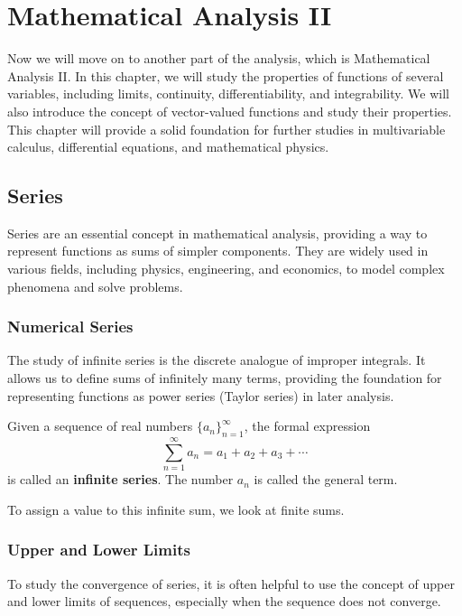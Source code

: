 \chapter{Mathematical Analysis II}

Now we will move on to another part of the analysis, which is Mathematical Analysis II. In this chapter, we will study the properties of functions of several variables, including limits, continuity, differentiability, and integrability. We will also introduce the concept of vector-valued functions and study their properties. This chapter will provide a solid foundation for further studies in multivariable calculus, differential equations, and mathematical physics.

\section{Series}

Series are an essential concept in mathematical analysis, providing a way to represent functions as sums of simpler components. They are widely used in various fields, including physics, engineering, and economics, to model complex phenomena and solve problems.

\subsection{Numerical Series}

The study of infinite series is the discrete analogue of improper integrals. It allows us to define sums of infinitely many terms, providing the foundation for representing functions as power series (Taylor series) in later analysis.

\begin{definition}
Given a sequence of real numbers $\{a_n\}_{n=1}^{\infty}$, the formal expression
\[ \sum_{n=1}^{\infty} a_n = a_1 + a_2 + a_3 + \cdots \]
is called an \textbf{infinite series}. The number $a_n$ is called the general term.
\end{definition}

To assign a value to this infinite sum, we look at finite sums.

\subsection{Upper and Lower Limits}

To study the convergence of series, it is often helpful to use the concept of upper and lower limits of sequences, especially when the sequence does not converge.

